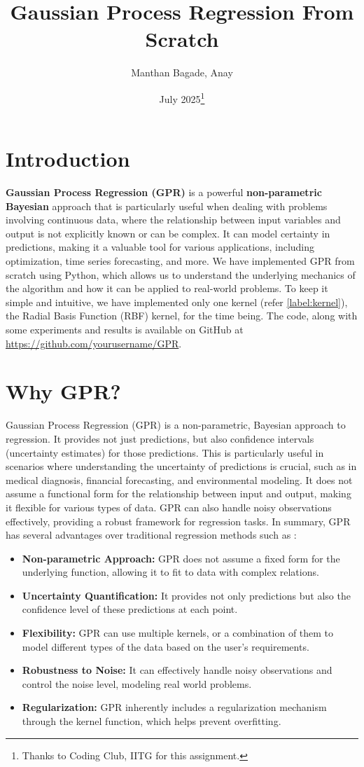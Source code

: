\documentclass{article}
\title{Gaussian Process Regression From Scratch}
\author{Manthan Bagade, Anay}
\date{July 2025\thanks{Thanks to Coding Club, IITG for this assignment.}}
\begin{document}
\maketitle

\section{Introduction}
\label{sec:introduction}
\textbf{Gaussian Process Regression (GPR)} is a powerful \textbf{non-parametric Bayesian} approach that is particularly useful when dealing with problems involving continuous data, where the relationship between input variables and output is not explicitly known or can be complex. It can model certainty in predictions, making it a valuable tool for various applications, including optimization, time series forecasting, and more. \newline
We have implemented GPR from scratch using Python, which allows us to understand the underlying mechanics of the algorithm and how it can be applied to real-world problems. To keep it simple and intuitive, we have implemented only one kernel (refer \autoref{label:kernel}), the Radial Basis Function (RBF) kernel, for the time being. The code, along with some experiments and results is available on GitHub at \url{https://github.com/yourusername/GPR}.
\section{Why GPR?}
\label{sec:why_gpr}
Gaussian Process Regression (GPR) is a non-parametric, Bayesian approach to regression. It provides not just predictions, but also confidence intervals (uncertainty estimates) for those predictions. This is particularly useful in scenarios where understanding the uncertainty of predictions is crucial, such as in medical diagnosis, financial forecasting, and environmental modeling. It does not assume a functional form for the relationship between input and output, making it flexible for various types of data. GPR can also handle noisy observations effectively, providing a robust framework for regression tasks. In summary, GPR has several advantages over traditional regression methods such as :
\begin{itemize}
    \item \textbf{Non-parametric Approach:} GPR does not assume a fixed form for the underlying function, allowing it to fit to data with complex relations.
    \item \textbf{Uncertainty Quantification:} It provides not only predictions but also the confidence level of these predictions at each point.
    \item \textbf{Flexibility:} GPR can use multiple kernels, or a combination of them to model different types of the data based on the user's requirements.
    \item \textbf{Robustness to Noise:} It can effectively handle noisy observations and control the noise level, modeling real world problems.
    \item \textbf{Regularization:} GPR inherently includes a regularization mechanism through the kernel function, which helps prevent overfitting.
\end{itemize}
\end{document}
